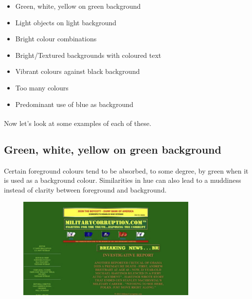 \begin{itemize}
    \item Green, white, yellow on green background
    \item Light objects on light background
    \item Bright colour combinations
    \item Bright/Textured backgrounds with coloured text
    \item Vibrant colours against black background
    \item Too many colours
    \item Predominant use of blue as background
\end{itemize}

\paragraph{} Now let's look at some examples of each of these.


\subsection{Green, white, yellow on green background}

\paragraph{} Certain foreground colours tend to be absorbed, to some degree, by green when it is used as a background colour. Similarities in hue can also lead to a muddiness instead of clarity between foreground and background.


\begin{figure}[H]
    \centering
    \includegraphics[width=0.8\textwidth]{figures/bad-colours-green-yellow-1}
    \label{fig:bad-colours-green-yellow-1}
    \caption{}
\end{figure}


